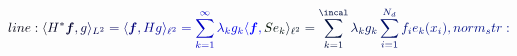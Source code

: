 \documentclass[12pt]{article}
\begin{document}
\makeatletter
\renewcommand*{\@textcolor}[3]{%
  \protect\leavevmode
  \begingroup
    \color#1{#2}#3%
  \endgroup
}
\makeatother
\begin{displaymath}
\mathcolor[RGB]{0,0,15}{line:
\langle} \mathcolor[RGB]{0,0,30}{H^*} \mathcolor[RGB]{0,0,45}{\boldsymbol{f},} \mathcolor[RGB]{0,0,60}{g} \mathcolor[RGB]{0,0,75}{\rangle_{L^2}} \mathcolor[RGB]{0,0,90}{=} \mathcolor[RGB]{0,0,105}{\langle} \mathcolor[RGB]{0,0,120}{\boldsymbol{f},} \mathcolor[RGB]{0,0,135}{H} \mathcolor[RGB]{0,0,150}{g} \mathcolor[RGB]{0,0,165}{\rangle_{\ell^2}} \mathcolor[RGB]{0,0,180}{=} \mathcolor[RGB]{0,0,195}{\sum_{k=1}^{\infty}} \mathcolor[RGB]{0,0,210}{\lambda_k} \mathcolor[RGB]{0,0,225}{g_k} \mathcolor[RGB]{0,0,240}{\langle} \mathcolor[RGB]{0,0,255}{\boldsymbol{f},} \mathcolor[RGB]{0,15,0}{S} \mathcolor[RGB]{0,15,15}{e_k} \mathcolor[RGB]{0,15,30}{\rangle_{\ell^2}} \mathcolor[RGB]{0,15,45}{=} \mathcolor[RGB]{0,15,60}{\sum_{k=1}^{\incal}} \mathcolor[RGB]{0,15,75}{\lambda_k} \mathcolor[RGB]{0,15,90}{g_k} \mathcolor[RGB]{0,15,105}{\sum_{i=1}^{N_d}} \mathcolor[RGB]{0,15,120}{f_i} \mathcolor[RGB]{0,15,135}{e_k(x_i),

norm_str:}
\end{displaymath}
\end{document}
